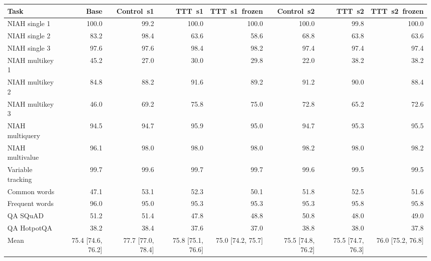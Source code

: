 \begin{tabular}{lrrrrrrr}
\toprule
Task & Base & Control~s1 & TTT~s1 & TTT~s1~frozen & Control~s2 & TTT~s2 & TTT~s2~frozen \\
\midrule
NIAH single 1 & 100.0 & 99.2 & 100.0 & 100.0 & 100.0 & 99.8 & 100.0 \\
NIAH single 2 & 83.2 & 98.4 & 63.6 & 58.6 & 68.8 & 63.8 & 63.6 \\
NIAH single 3 & 97.6 & 97.6 & 98.4 & 98.2 & 97.4 & 97.4 & 97.4 \\
NIAH multikey 1 & 45.2 & 27.0 & 30.0 & 29.8 & 22.0 & 38.2 & 38.2 \\
NIAH multikey 2 & 84.8 & 88.2 & 91.6 & 89.2 & 91.2 & 90.0 & 88.4 \\
NIAH multikey 3 & 46.0 & 69.2 & 75.8 & 75.0 & 72.8 & 65.2 & 72.6 \\
NIAH multiquery & 94.5 & 94.7 & 95.9 & 95.0 & 94.7 & 95.3 & 95.5 \\
NIAH multivalue & 96.1 & 98.0 & 98.0 & 98.0 & 98.2 & 98.0 & 98.2 \\
Variable tracking & 99.7 & 99.6 & 99.7 & 99.7 & 99.6 & 99.5 & 99.5 \\
Common words & 47.1 & 53.1 & 52.3 & 50.1 & 51.8 & 52.5 & 51.6 \\
Frequent words & 96.0 & 95.0 & 95.3 & 95.3 & 95.3 & 95.8 & 95.8 \\
QA SQuAD & 51.2 & 51.4 & 47.8 & 48.8 & 50.8 & 48.0 & 49.0 \\
QA HotpotQA & 38.2 & 38.4 & 37.6 & 37.0 & 38.8 & 38.0 & 37.8 \\
\midrule
Mean & 75.4 [74.6, 76.2] & 77.7 [77.0, 78.4] & 75.8 [75.1, 76.6] & 75.0 [74.2, 75.7] & 75.5 [74.8, 76.2] & 75.5 [74.7, 76.3] & 76.0 [75.2, 76.8] \\
\bottomrule
\end{tabular}
